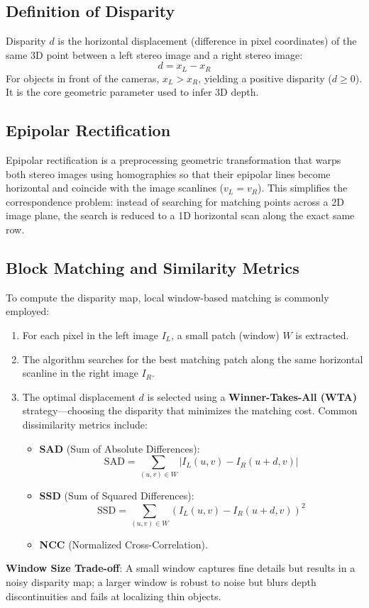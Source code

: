 
\section[Question -- {\it Disparity Map and Stereo Vision}]{}

\subsection{Definition of Disparity}
Disparity $d$ is the horizontal displacement (difference in pixel coordinates) of the same 3D point between a left stereo image and a right stereo image:
\[
  d = x_L - x_R
\]
For objects in front of the cameras, $x_L > x_R$, yielding a positive disparity ($d \ge 0$). It is the core geometric parameter used to infer 3D depth.

\subsection{Epipolar Rectification}
Epipolar rectification is a preprocessing geometric transformation that warps both stereo images using homographies so that their epipolar lines become horizontal and coincide with the image scanlines ($v_L = v_R$). 
This simplifies the correspondence problem: instead of searching for matching points across a 2D image plane, the search is reduced to a 1D horizontal scan along the exact same row.

\subsection{Block Matching and Similarity Metrics}
To compute the disparity map, local window-based matching is commonly employed:
\begin{enumerate}
    \item For each pixel in the left image $I_L$, a small patch (window) $W$ is extracted.
    \item The algorithm searches for the best matching patch along the same horizontal scanline in the right image $I_R$.
    \item The optimal displacement $d$ is selected using a \textbf{Winner-Takes-All (WTA)} strategy—choosing the disparity that minimizes the matching cost. Common dissimilarity metrics include:
    \begin{itemize}
        \item \textbf{SAD} (Sum of Absolute Differences): 
        \[ \text{SAD} = \sum_{(u,v)\in W} |I_L(u,v) - I_R(u+d, v)| \]
        \item \textbf{SSD} (Sum of Squared Differences): 
        \[ \text{SSD} = \sum_{(u,v)\in W} (I_L(u,v) - I_R(u+d, v))^2 \]
        \item \textbf{NCC} (Normalized Cross-Correlation).
    \end{itemize}
\end{enumerate}
\textbf{Window Size Trade-off}: A small window captures fine details but results in a noisy disparity map; a larger window is robust to noise but blurs depth discontinuities and fails at localizing thin objects.

